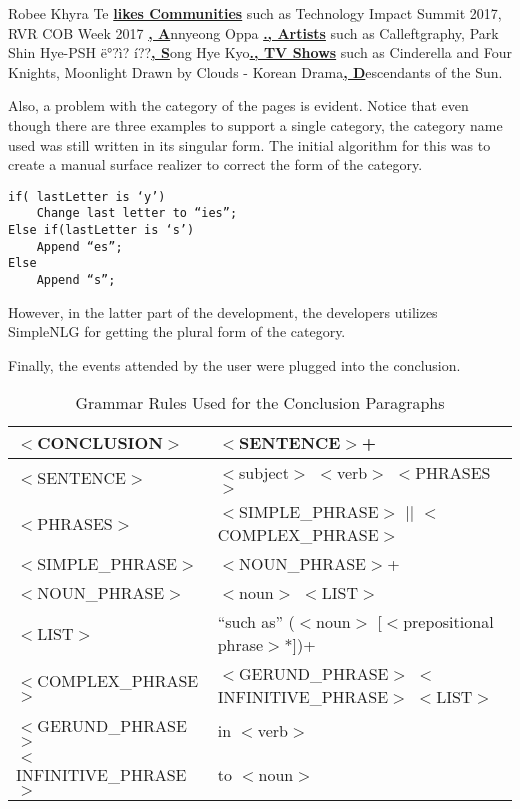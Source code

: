 \begin{center} Robee Khyra Te \underline{\textbf{likes Communities}} such as Technology Impact Summit 2017, RVR COB Week 2017 \underline{\textbf{, A}}nnyeong Oppa \underline{\textbf{., Artists}} such as Calleftgraphy, Park Shin Hye-PSH ë°?ì? í??\underline{\textbf{, S}}ong Hye Kyo\underline{\textbf{., TV Shows}} such as Cinderella and Four Knights, Moonlight Drawn by Clouds - Korean Drama\underline{\textbf{, D}}escendants of the Sun. \end{center}

Also, a problem with the category of the pages is evident. Notice that even though there are three examples to support a single category, the category name used was still written in its singular form. The initial algorithm for this was to create a manual surface realizer to correct the form of the category.
\begin{lstlisting}
if( lastLetter is ‘y’)
	Change last letter to “ies”;
Else if(lastLetter is ‘s’)
	Append “es”;
Else
	Append “s”;
\end{lstlisting}

However, in the latter part of the development, the developers utilizes SimpleNLG for getting the plural form of the category. 

Finally, the events attended by the user were plugged into the conclusion.

 \clearpage
\begin{table}[ph!]   %
	\centering
	\caption{Grammar Rules Used for the Conclusion Paragraphs} \vspace{0.25em}
	\begin{tabular}{|p{2in}|p{2.5in}|} \hline
		$<$CONCLUSION$>$ & $<$SENTENCE$>$+ \\ \hline
		$<$SENTENCE$>$ & $<$subject$>$ $<$verb$>$ $<$PHRASES$>$ \\ \hline
		$<$PHRASES$>$ & $<$SIMPLE\_PHRASE$>$ $|$$|$ \newline $<$COMPLEX\_PHRASE$>$ \\ \hline
		$<$SIMPLE\_PHRASE$>$ & $<$NOUN\_PHRASE$>$+ \\ \hline
		$<$NOUN\_PHRASE$>$ & $<$noun$>$ $<$LIST$>$ \\ \hline
		$<$LIST$>$ & ``such as” ($<$noun$>$ [$<$prepositional phrase$>$*])+ \\ \hline
		$<$COMPLEX\_PHRASE$>$ & $<$GERUND\_PHRASE$>$ $<$INFINITIVE\_PHRASE$>$ $<$LIST$>$ \\ \hline
		$<$GERUND\_PHRASE$>$ & in $<$verb$>$ \\ \hline
		$<$INFINITIVE\_PHRASE$>$ & to $<$noun$>$ \\ \hline
	\end{tabular}
	\label{tab:GrammarRules-Conclusion}
\end{table}

